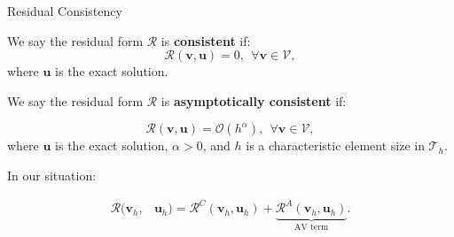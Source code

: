 \documentclass{beamer}
\newcounter{sectionframecount}
\begin{document}
\begin{frame}[t]{Residual Consistency}
\vspace{-10pt}
  \begin{itemize}
    \item We say the residual form $\mathcal{R}$ is \textbf{consistent} if:
    \begin{equation}
      \mathcal{R}(\boldsymbol{v},\boldsymbol{u}) = 0,~~\forall \boldsymbol{v} \in \mathcal{V},
    \end{equation}
    where $\boldsymbol{u}$ is the exact solution.

    {
    \item We say the residual form $\mathcal{R}$ is \textbf{asymptotically consistent} if:

    \begin{equation}
      \mathcal{R}(\boldsymbol{v},\boldsymbol{u}) = \mathcal{O}(h^\alpha),~~\forall \boldsymbol{v} \in \mathcal{V},
      \label{e:asymptotic_consistent}
    \end{equation}
    where $\boldsymbol{u}$ is the exact solution, $\alpha>0$, and $h$ is a characteristic element size in $\mathcal{T}_h$.
    }
  \end{itemize}

{
\vspace{10pt}
In our situation:

\begin{equation}
  \begin{split}
  \mathcal{R}(\boldsymbol{v}_h,&\boldsymbol{u}_h) =
  \mathcal{R}^C(\boldsymbol{v}_h,\boldsymbol{u}_h) + \underbrace{\mathcal{R}^A(\boldsymbol{v}_h,\boldsymbol{u}_h)}_{\text{AV term}}.
  \end{split}
  \label{e:residual_C_A_decomposition}
\end{equation}
}

\end{frame}

\end{document}

